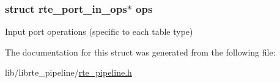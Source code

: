 \subsubsection[{ops}]{\setlength{\rightskip}{0pt plus 5cm}struct {\bf rte\+\_\+port\+\_\+in\+\_\+ops}$\ast$ ops}\label{structrte__pipeline__port__in__params_ad8c92480b58ad5e6b7917c16b5ea7b3d}
Input port operations (specific to each table type) 

The documentation for this struct was generated from the following file\+:\begin{DoxyCompactItemize}
\item 
lib/librte\+\_\+pipeline/\hyperlink{rte__pipeline_8h}{rte\+\_\+pipeline.\+h}\end{DoxyCompactItemize}
